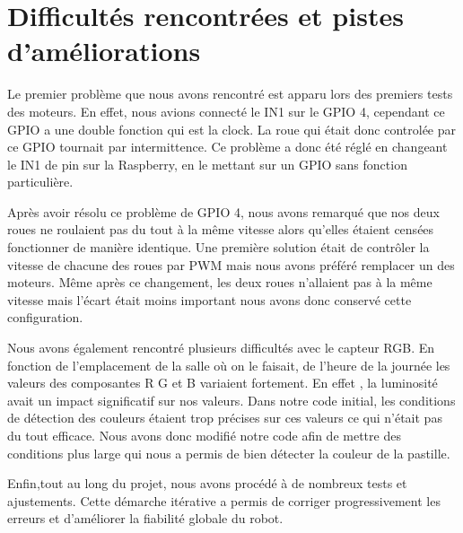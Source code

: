 \section{Difficultés rencontrées et pistes d'améliorations}

Le premier problème que nous avons rencontré est apparu lors des premiers tests des moteurs. En effet, nous avions connecté le IN1 sur le GPIO 4, cependant ce GPIO a une double fonction qui est la clock. La roue qui était donc controlée par ce GPIO tournait par intermittence. Ce problème a donc été réglé en changeant le IN1 de pin sur la Raspberry, en le mettant sur un GPIO sans fonction particulière.

Après avoir résolu ce problème de GPIO 4, nous avons remarqué que nos deux roues ne roulaient pas du tout à la même vitesse alors qu'elles étaient censées fonctionner de manière identique. Une première solution était de contrôler la vitesse de chacune des roues par PWM mais nous avons préféré remplacer un des moteurs. Même après ce changement, les deux roues n'allaient pas à la même vitesse mais l'écart était moins important nous avons donc conservé cette configuration.

Nous avons également rencontré plusieurs difficultés avec le capteur RGB. En fonction de l'emplacement de la salle où on le faisait, de l'heure de la journée les valeurs des composantes R G et B variaient fortement. En effet , la luminosité avait un impact significatif sur nos valeurs. Dans notre code initial, les conditions de détection des couleurs étaient trop précises sur ces valeurs ce qui n'était pas du tout efficace. Nous avons donc modifié notre code afin de mettre des conditions plus large qui nous a permis de bien détecter la couleur de la pastille.

Enfin,tout au long du projet, nous avons procédé à de nombreux tests et ajustements. Cette démarche itérative a permis de corriger progressivement les erreurs et d'améliorer la fiabilité globale du robot. 